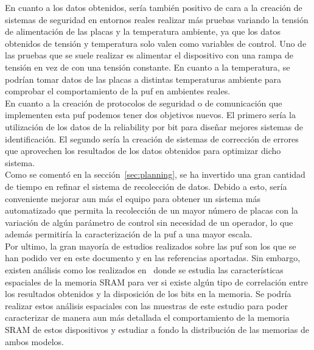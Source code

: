 \documentclass[spanish]{template/minim}
\begin{document}
En cuanto a los datos obtenidos, sería también positivo de cara a la creación de sistemas de seguridad en entornos reales realizar más pruebas variando la tensión de alimentación de las placas y la temperatura ambiente, ya que los datos obtenidos de tensión y temperatura solo valen como variables de control. Uno de las pruebas que se suele realizar es alimentar el dispositivo con una rampa de tensión en vez de con una tensión constante. En cuanto a la temperatura, se podrían tomar datos de las placas a distintas temperaturas ambiente para comprobar el comportamiento de la \gls{puf} en ambientes reales.\\


En cuanto a la creación de protocolos de seguridad o de comunicación que implementen esta \gls{puf} podemos tener dos objetivos nuevos. El primero sería la utilización de los datos de la reliability por bit para diseñar mejores sistemas de identificación. El segundo sería la creación de sistemas de corrección de errores que aprovechen los resultados de los datos obtenidos para optimizar dicho sistema.\\


Como se comentó en la sección~\ref{sec:planning}, se ha invertido una gran cantidad de tiempo en refinar el sistema de recolección de datos. Debido a esto, sería conveniente mejorar aun más el equipo para obtener un sistema más automatizado que permita la recolección de un mayor número de placas con la variación de algún parámetro de control sin necesidad de un operador, lo que además permitiría la caracterización de la \gls{puf} a una mayor escala.\\

Por ultimo, la gran mayoría de estudios realizados sobre las \gls{puf} son los que se han podido ver en este documento y en las referencias aportadas. Sin embargo, existen análisis como los realizados en~\cite{spatial} donde se estudia las características espaciales de la memoria SRAM para ver si existe algún tipo de correlación entre los resultados obtenidos y la disposición de los bits en la memoria. Se podría realizar estos análisis espaciales con las muestras de este estudio para poder caracterizar de manera aun más detallada el comportamiento de la memoria SRAM de estos dispositivos y estudiar a fondo la distribución de las memorias de ambos modelos.\\

\newpage
\glsaddall{}
\printglossaries{}

\newpage
\nocite{*}
\printbibliography[heading=bibintoc,title={Referencias}]

\end{document}
